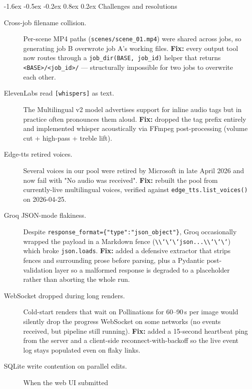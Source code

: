 \documentclass[11pt,a4paper]{article}
\makeatletter
\renewcommand\section{\@startsection{section}{1}{\z@}%
   {-1.6ex \@plus -0.5ex \@minus -0.2ex}%
   {0.8ex \@plus 0.2ex}%
   {\Large\bfseries\color{accent}}}
\newcommand{\code}[1]{\texttt{\small #1}}
\makeatother
\begin{document}
\bigskip
\section{Challenges and resolutions}

\begin{description}
  \item[Cross-job filename collision.] Per-scene MP4 paths
    (\code{scenes/scene\_01.mp4}) were shared across jobs, so generating job B
    overwrote job A's working files.  \textbf{Fix:} every output tool now
    routes through a \code{job\_dir(BASE, job\_id)} helper that returns
    \code{<BASE>/<job\_id>/} --- structurally impossible for two jobs to
    overwrite each other.
  \item[ElevenLabs read \texttt{[whispers]} as text.] The Multilingual v2 model
    advertises support for inline audio tags but in practice often pronounces
    them aloud. \textbf{Fix:} dropped the tag prefix entirely and implemented
    whisper acoustically via FFmpeg post-processing (volume cut + high-pass +
    treble lift).
  \item[Edge-tts retired voices.] Several voices in our pool were retired by
    Microsoft in late April 2026 and now fail with "No audio was received".
    \textbf{Fix:} rebuilt the pool from currently-live multilingual voices,
    verified against \code{edge\_tts.list\_voices()} on 2026-04-25.
  \item[Groq JSON-mode flakiness.] Despite \code{response\_format=\{"type":"json\_object"\}},
    Groq occasionally wrapped the payload in a Markdown fence
    (\code{\textbackslash\textbackslash`\textbackslash`\textbackslash`json...}\code{\textbackslash\textbackslash`\textbackslash`\textbackslash`}) which broke
    \code{json.loads}. \textbf{Fix:} added a defensive extractor that strips
    fences and surrounding prose before parsing, plus a Pydantic
    post-validation layer so a malformed response is degraded to a placeholder
    rather than aborting the whole run.
  \item[WebSocket dropped during long renders.] Cold-start renders that wait
    on Pollinations for 60--90\,s per image would silently drop the progress
    WebSocket on some networks (no events received, but pipeline still
    running). \textbf{Fix:} added a 15-second heartbeat ping from the server
    and a client-side reconnect-with-backoff so the live event log stays
    populated even on flaky links.
  \item[SQLite write contention on parallel edits.] When the web UI submitted

\end{description}
\end{document}

